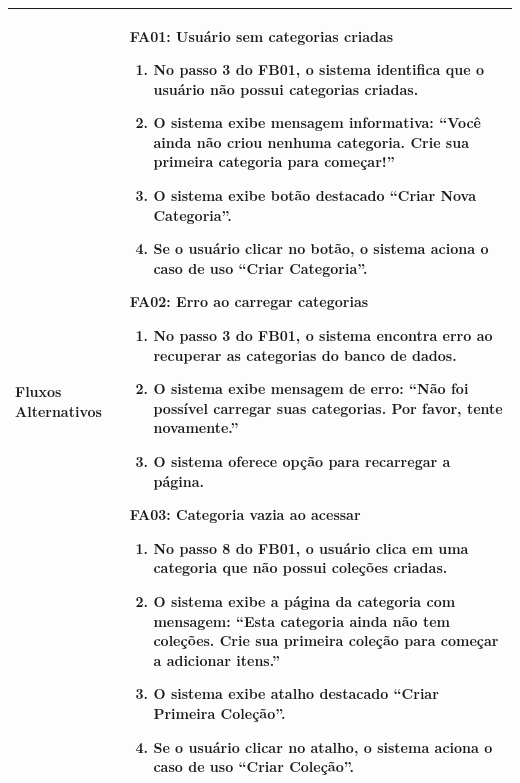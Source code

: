 \begin{longtable}{ >{\raggedright}p{2.8cm} | >{\raggedright\arraybackslash}p{10.7cm} }
Fluxos Alternativos & \mbox{}
\textbf{FA01:} Usuário sem categorias criadas
\vspace{2pt}
\begin{enumerate}[nosep,leftmargin=1.2em,topsep=0pt,partopsep=0pt,parsep=0pt,itemsep=0pt,after=\vspace{2pt}]
	\item No passo 3 do FB01, o sistema identifica que o usuário não possui categorias criadas.
	\item O sistema exibe mensagem informativa: ``Você ainda não criou nenhuma categoria. Crie sua primeira categoria para começar!''
	\item O sistema exibe botão destacado ``Criar Nova Categoria''.
	\item Se o usuário clicar no botão, o sistema aciona o caso de uso ``Criar Categoria''.
\end{enumerate}

\textbf{FA02:} Erro ao carregar categorias
\vspace{2pt}
\begin{enumerate}[nosep,leftmargin=1.2em,topsep=0pt,partopsep=0pt,parsep=0pt,itemsep=0pt,after=\vspace{2pt}]
	\item No passo 3 do FB01, o sistema encontra erro ao recuperar as categorias do banco de dados.
	\item O sistema exibe mensagem de erro: ``Não foi possível carregar suas categorias. Por favor, tente novamente.''
	\item O sistema oferece opção para recarregar a página.
\end{enumerate}

\textbf{FA03:} Categoria vazia ao acessar
\vspace{2pt}
\begin{enumerate}[nosep,leftmargin=1.2em,topsep=0pt,partopsep=0pt,parsep=0pt,itemsep=0pt,after=\vspace{2pt}]
	\item No passo 8 do FB01, o usuário clica em uma categoria que não possui coleções criadas.
	\item O sistema exibe a página da categoria com mensagem: ``Esta categoria ainda não tem coleções. Crie sua primeira coleção para começar a adicionar itens.''
	\item O sistema exibe atalho destacado ``Criar Primeira Coleção''.
	\item Se o usuário clicar no atalho, o sistema aciona o caso de uso ``Criar Coleção''.
\end{enumerate}
\mbox{} \\ \hline


\end{longtable}
